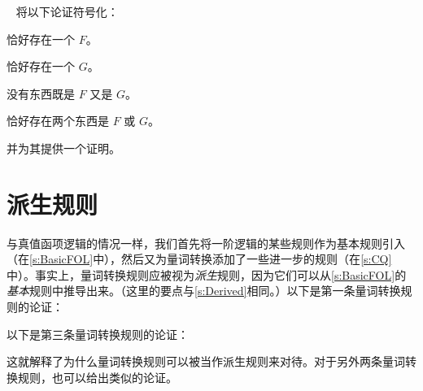 \
\problempart
将以下论证符号化：
\begin{earg}
		\item 恰好存在一个 $F$。
		\item 恰好存在一个 $G$。
		\item 没有东西既是 $F$ 又是 $G$。
		\item[\texttherefore] 恰好存在两个东西是 $F$ 或 $G$。
	\end{earg}
并为其提供一个证明。

\chapter{派生规则}\label{s:DerivedFOL}
与真值函项逻辑的情况一样，我们首先将一阶逻辑的某些规则作为基本规则引入（在\cref{s:BasicFOL}中），然后又为量词转换添加了一些进一步的规则（在\cref{s:CQ}中）。事实上，量词转换规则应被视为\emph{派生}规则，因为它们可以从\cref{s:BasicFOL}的\emph{基本}规则中推导出来。（这里的要点与\cref{s:Derived}相同。）以下是第一条量词转换规则的论证：
\begin{fitchproof}
	\open
		\AS
		\open
			\AS
		\close
	\close
\end{fitchproof}
以下是第三条量词转换规则的论证：
\begin{fitchproof}
	\open
		\AS
		\open
			\AS
		\close
	\close
\end{fitchproof}
这就解释了为什么量词转换规则可以被当作派生规则来对待。对于另外两条量词转换规则，也可以给出类似的论证。

